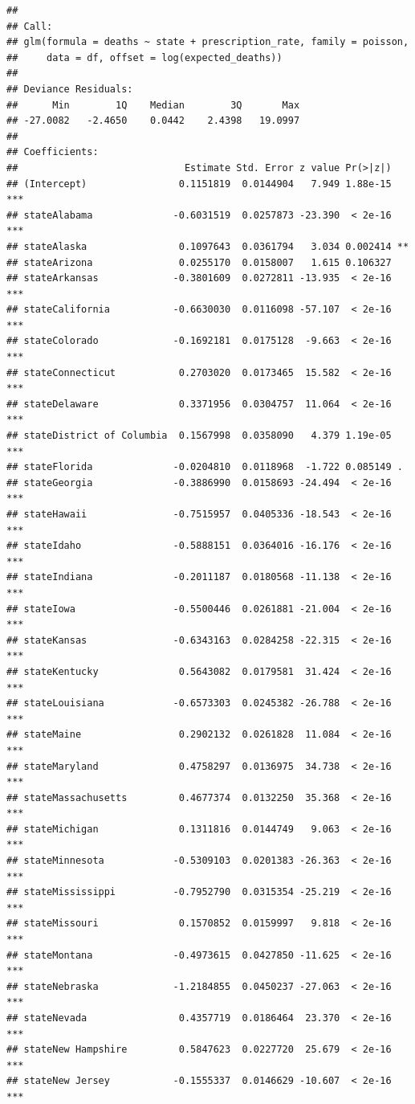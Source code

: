 \documentclass[]{article}
\begin{document}
\begin{verbatim}
## 
## Call:
## glm(formula = deaths ~ state + prescription_rate, family = poisson, 
##     data = df, offset = log(expected_deaths))
## 
## Deviance Residuals: 
##      Min        1Q    Median        3Q       Max  
## -27.0082   -2.4650    0.0442    2.4398   19.0997  
## 
## Coefficients:
##                             Estimate Std. Error z value Pr(>|z|)    
## (Intercept)                0.1151819  0.0144904   7.949 1.88e-15 ***
## stateAlabama              -0.6031519  0.0257873 -23.390  < 2e-16 ***
## stateAlaska                0.1097643  0.0361794   3.034 0.002414 ** 
## stateArizona               0.0255170  0.0158007   1.615 0.106327    
## stateArkansas             -0.3801609  0.0272811 -13.935  < 2e-16 ***
## stateCalifornia           -0.6630030  0.0116098 -57.107  < 2e-16 ***
## stateColorado             -0.1692181  0.0175128  -9.663  < 2e-16 ***
## stateConnecticut           0.2703020  0.0173465  15.582  < 2e-16 ***
## stateDelaware              0.3371956  0.0304757  11.064  < 2e-16 ***
## stateDistrict of Columbia  0.1567998  0.0358090   4.379 1.19e-05 ***
## stateFlorida              -0.0204810  0.0118968  -1.722 0.085149 .  
## stateGeorgia              -0.3886990  0.0158693 -24.494  < 2e-16 ***
## stateHawaii               -0.7515957  0.0405336 -18.543  < 2e-16 ***
## stateIdaho                -0.5888151  0.0364016 -16.176  < 2e-16 ***
## stateIndiana              -0.2011187  0.0180568 -11.138  < 2e-16 ***
## stateIowa                 -0.5500446  0.0261881 -21.004  < 2e-16 ***
## stateKansas               -0.6343163  0.0284258 -22.315  < 2e-16 ***
## stateKentucky              0.5643082  0.0179581  31.424  < 2e-16 ***
## stateLouisiana            -0.6573303  0.0245382 -26.788  < 2e-16 ***
## stateMaine                 0.2902132  0.0261828  11.084  < 2e-16 ***
## stateMaryland              0.4758297  0.0136975  34.738  < 2e-16 ***
## stateMassachusetts         0.4677374  0.0132250  35.368  < 2e-16 ***
## stateMichigan              0.1311816  0.0144749   9.063  < 2e-16 ***
## stateMinnesota            -0.5309103  0.0201383 -26.363  < 2e-16 ***
## stateMississippi          -0.7952790  0.0315354 -25.219  < 2e-16 ***
## stateMissouri              0.1570852  0.0159997   9.818  < 2e-16 ***
## stateMontana              -0.4973615  0.0427850 -11.625  < 2e-16 ***
## stateNebraska             -1.2184855  0.0450237 -27.063  < 2e-16 ***
## stateNevada                0.4357719  0.0186464  23.370  < 2e-16 ***
## stateNew Hampshire         0.5847623  0.0227720  25.679  < 2e-16 ***
## stateNew Jersey           -0.1555337  0.0146629 -10.607  < 2e-16 ***

\end{verbatim}
\end{document}
